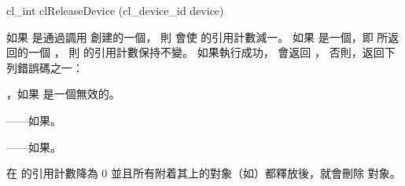 \startclc
cl_int clReleaseDevice (cl_device_id device)
\stopclc

如果  是通過調用  創建的一個，
則  會使  的引用計數減一。
如果  是一個，即  所返回的一個 ，
則  的引用計數保持不變。
如果執行成功， 會返回 ，
否則，返回下列錯誤碼之一：
\startigBase
\item {}，如果  是一個無效的。
\item {}——如果\scdevfailres。
\item {}——如果\schostfailres。
\stopigBase

在  的引用計數降為 0 並且所有附着其上的對象（如）都釋放後，就會刪除  對象。

